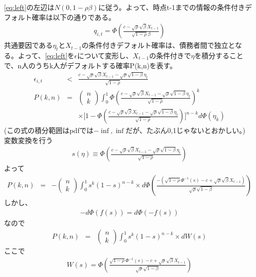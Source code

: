 \documentclass[a4j,12pt]{jarticle}
\begin{document}
\eqref{eq:left}の左辺は$N(0,1-\rho\beta)$に従う。よって、時点t-1までの情報の条件付きデフォルト確率は以下の通りである。
\begin{eqnarray}
q_{i,t}=\Phi(\frac{c-\sqrt{\rho}\sqrt{\beta}X_{t-1}}{\sqrt{1-\rho}\beta})
\end{eqnarray}
共通要因である$\eta_t$と$X_{t-1}$の条件付きデフォルト確率は、債務者間で独立となる。よって、\eqref{eq:left}を$\epsilon$について変形し、$X_{t-1}$の条件付きで$\eta$を積分することで、n人のうちk人がデフォルトする確率P(k,n)を表す。
\begin{eqnarray}
\epsilon_{i,t}&<&
\frac{c-\sqrt{\rho}\sqrt{\beta}X_{t-1}-\sqrt{\rho}\sqrt{1-\beta}\eta_t}
{\sqrt{1-\rho}}\nonumber\\
P(k,n)&=&
\begin{pmatrix}
n\\
k
\end{pmatrix}
\int_{0}^{1}\Phi(\frac{c-\sqrt{\rho}\sqrt{\beta}X_{t-1}-\sqrt{\rho}\sqrt{1-\beta}\eta_t}{\sqrt{1-\rho}})^k\nonumber\\
&&\times \bigl[
1-
\Phi(
\frac{c-\sqrt{\rho}\sqrt{\beta}X_{t-1}-\sqrt{\rho}\sqrt{1-\beta}\eta_t}{\sqrt{1-\rho}}
)
\bigr]^{n-k}d\Phi(\eta_k)
\end{eqnarray}
(この式の積分範囲はpdfでは$-\inf,\inf$だが、たぶん0,1じゃないとおかしい。)\\
変数変換を行う
\begin{eqnarray}
s(\eta)
\equiv
\Phi(
\frac{c-\sqrt{\rho}\sqrt{\beta}X_{t-1}-\sqrt{\rho}\sqrt{1-\beta}\eta_t}{\sqrt{1-\rho}}
)
\end{eqnarray}
よって
\begin{eqnarray}
P(k,n)&=&
-
\begin{pmatrix}
n\\
k
\end{pmatrix}
\int_{0}^{1}s^k(1-s)^{n-k}
\times
d \Phi(
\frac{-(\sqrt{1-\rho}\Phi^{-1}(s)-c+\sqrt{\rho}\sqrt{\beta}X_{t-1})}
{\sqrt{\rho}\sqrt{1-\beta}}
)
\end{eqnarray}
しかし、
\begin{eqnarray}
-d\Phi(f(s))=d\Phi(-f(s))
\end{eqnarray}
なので
\begin{eqnarray}
P(k,n)&=&
\begin{pmatrix}
n\\
k
\end{pmatrix}
\int_{0}^{1}s^k(1-s)^{n-k}
\times
dW(s)
\end{eqnarray}
ここで
\begin{eqnarray}
W(s)=\Phi(
\frac{\sqrt{1-\rho}\Phi^{-1}(s)-c+\sqrt{\rho}\sqrt{\beta}X_{t-1}}{\sqrt{\rho}\sqrt{1-\beta}}
)
\end{eqnarray}
\end{document}
